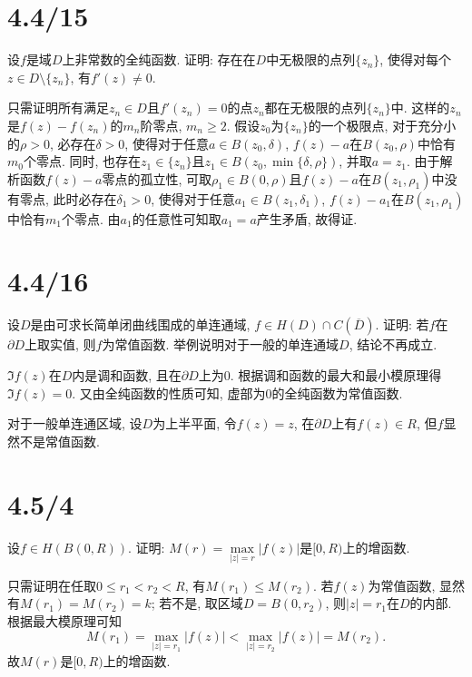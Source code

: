 \documentclass[11pt,a4paper]{article}
\author{刘逸灏 (515370910207)}
\begin{document}
\maketitle

\section{4.4/15}
\begin{problem}
设$f$是域$D$上非常数的全纯函数. 证明: 存在在$D$中无极限的点列$\{z_n\}$, 使得对每个$z\in D\setminus\{z_n\}$, 有$f'(z)\neq 0.$
\end{problem}

只需证明所有满足$z_n\in D$且$f'(z_n)=0$的点$z_n$都在无极限的点列$\{z_n\}$中. 这样的$z_n$是$f(z)-f(z_n)$的$m_n$阶零点, $m_n\geqslant2$. 假设$z_0$为$\{z_n\}$的一个极限点, 对于充分小的$\rho>0$, 必存在$\delta>0$, 使得对于任意$a\in B(z_0,\delta)$, $f(z)-a$在$B(z_0,\rho)$中恰有$m_0$个零点.
同时, 也存在$z_1\in\{z_n\}$且$z_1\in B(z_0,\min\{\delta,\rho\})$, 并取$a=z_1$. 由于解析函数$f(z)-a$零点的孤立性, 可取$\rho_1\in B(0,\rho)$且$f(z)-a$在$B(z_1,\rho_1)$中没有零点, 此时必存在$\delta_1>0$, 使得对于任意$a_1\in B(z_1,\delta_1)$, $f(z)-a_1$在$B(z_1,\rho_1)$中恰有$m_1$个零点.
由$a_1$的任意性可知取$a_1=a$产生矛盾, 故得证.

\section{4.4/16}
\begin{problem}
设$D$是由可求长简单闭曲线围成的单连通域, $f\in H(D)\cap C(\overline{D})$. 证明: 若$f$在$\partial D$上取实值, 则$f$为常值函数. 举例说明对于一般的单连通域$D$, 结论不再成立.
\end{problem}
$\Im{f(z)}$在$D$内是调和函数, 且在$\partial D$上为0. 根据调和函数的最大和最小模原理得$\Im{f(z)}=0$. 又由全纯函数的性质可知, 虚部为0的全纯函数为常值函数. \medskip

对于一般单连通区域, 设$D$为上半平面, 令$f(z)=z$, 在$\partial D$上有$f(z)\in R$, 但$f$显然不是常值函数.

\section{4.5/4}
\begin{problem}
设$f\in H(B(0,R))$. 证明: $M(r)=\max\limits_{|z|=r}|f(z)|$是$[0,R)$上的增函数.
\end{problem}
只需证明在任取$0\leqslant r_1<r_2<R$, 有$M(r_1)\leqslant M(r_2)$. 若$f(z)$为常值函数, 显然有$M(r_1)=M(r_2)=k$; 若不是, 取区域$D=B(0,r_2)$, 则$|z|=r_1$在$D$的内部. 根据最大模原理可知
$$M(r_1)=\max\limits_{|z|=r_1}|f(z)|<\max\limits_{|z|=r_2}|f(z)|=M(r_2).$$
故$M(r)$是$[0,R)$上的增函数.
\end{document}

